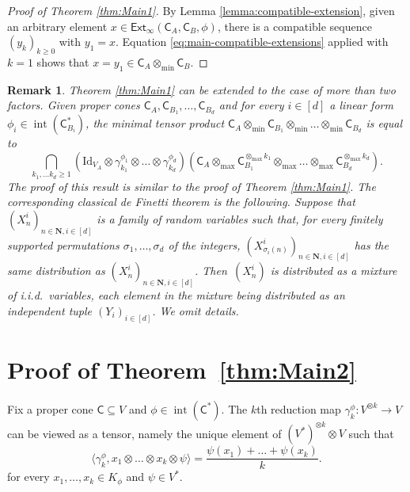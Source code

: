 \documentclass{amsart}
\newcommand{\iy}{\infty}
\renewcommand{\geq}{\geqslant}
\renewcommand{\subset}{\subseteq}
\newcommand{\gC}{\mathsf{C}}
\newcommand{\N}{\mathbf{N}}
\newcommand{\Id}{\mathrm{Id}}
\newcommand{\Ext}{\mathsf{Ext}}
\DeclareMathOperator{\inter}{int}
\theoremstyle{plain}
\newtheorem{remark}{Remark}
\newcommand{\tmin}{{\otimes_{\min}}}
\newcommand{\tmax}{{\otimes_{\max}}}
\begin{document}
\begin{proof}[Proof of Theorem \ref{thm:Main1}]
By Lemma \ref{lemma:compatible-extension}, given an arbitrary element $x \in \Ext_{\iy}(\gC_A,\gC_B,\phi)$, there is a compatible sequence $(y_k)_{k \geq 0}$ with $y_1=x$. Equation \eqref{eq:main-compatible-extensions} applied with $k=1$ shows that $x=y_1 \in \gC_A \tmin \gC_B$.
\end{proof}

\begin{remark}
\normalfont
Theorem \ref{thm:Main1} can be extended to the case of more than two factors. Given proper cones $\gC_A,\gC_{B_1},\dots,\gC_{B_d}$ and for every $i \in [d]$ a linear form $\phi_i \in \inter(\gC_{B_i}^*)$, the minimal tensor product $ \gC_A \tmin \gC_{B_1} \tmin \dots \tmin \gC_{B_d}$ is equal to
\[\bigcap_{k_1,\dots k_d \geq 1}
\left( \Id_{V_A} \otimes \gamma_{k_1}^{\phi_1} \otimes \dots \otimes \gamma_{k_d}^{\phi_d} \right)\left( \gC_A \tmax \gC_{B_1}^{\tmax k_1} \tmax \dots \tmax \gC_{B_d}^{\tmax k_d} \right).
\]
The proof of this result is  similar to the proof of Theorem \ref{thm:Main1}. The corresponding classical de Finetti theorem is the following. Suppose that $(X_n^i)_{n \in \N, i \in [d]}$ is a family of random variables such that, for every finitely supported permutations $\sigma_1,\dots,\sigma_d$ of the integers, $(X_{\sigma_i(n)}^i)_{n \in \N, i \in [d]}$ has the same distribution as $(X_n^i)_{n \in \N, i \in [d]}$. Then~$(X^i_n)$ is distributed as a mixture of i.i.d.\ variables, each element in the mixture being distributed as an independent tuple $(Y_i)_{i \in [d]}$. We omit details.
\end{remark}

\section{Proof of Theorem~\ref{thm:Main2}}\label{sec:HierarchyFinite}

Fix a proper cone $\gC \subset V$ and $\phi \in \inter (\gC^*)$. The $k$th reduction map $\gamma_k^\phi : V^{\otimes k} \to V$ can be viewed as a tensor, namely the unique element of $(V^*)^{\otimes k} \otimes V$ such that
\begin{equation} \label{eq:gamma-pure-tensor} \langle \gamma_k^\phi, x_1 \otimes \dots \otimes x_k \otimes \psi \rangle = \frac{\psi(x_1) + \dots + \psi(x_k)}{k}.\end{equation}
for every  $x_1,\dots,x_k \in K_\phi$ and $\psi \in V^*$.
\end{document}
